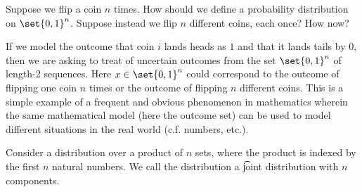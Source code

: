 

Suppose we flip a coin $n$ times.
How should we define a probability distribution on $\set{0, 1}^n$.
Suppose instead we flip $n$ different coins, each once?
How now?


If we model the outcome that coin $i$ lands heads as $1$ and that it lands tails by $0$, then we are asking to treat of uncertain outcomes from the set $\set{0, 1}^n$ of length-2 sequences.
Here $x \in \set{0, 1}^n$ could correspond to the outcome of flipping one coin $n$ times or the outcome of flipping $n$ different coins.
This is a simple example of a frequent and obvious phenomenon in mathematics wherein the same mathematical model (here the outcome set) can be used to model different situations in the real world (c.f. numbers, etc.).


Consider a distribution over a product of $n$ sets, where the product is indexed by the first $n$ natural numbers.
We call the distribution a \t{joint distribution} with $n$ components.

\blankpage
